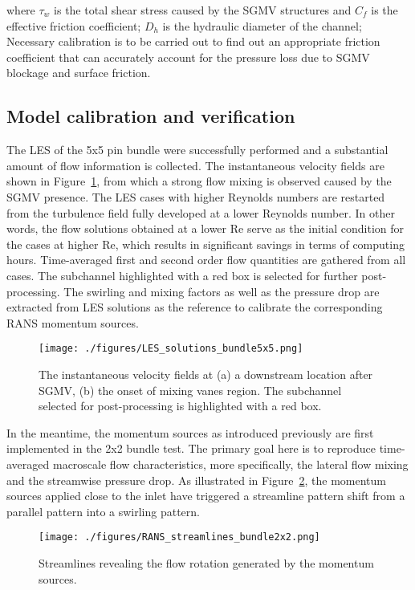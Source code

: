 where $\tau_w$ is the total shear stress caused by the SGMV structures and
$C_f$ is the effective friction coefficient;
$D_h$ is the hydraulic diameter of the channel;
Necessary calibration is to be carried out to find out an appropriate friction coefficient that can accurately account for the pressure loss due to SGMV blockage and surface friction.


\subsection{Model calibration and verification}
\label{sec:msm2}

The LES of the 5x5 pin bundle were successfully performed and a substantial amount of flow information is collected.
The instantaneous velocity fields are shown in Figure~\ref{fig:velles}, from which a strong flow mixing is observed caused by the SGMV presence.
The LES cases with higher Reynolds numbers are restarted from the turbulence field fully developed at a lower Reynolds number.
In other words, the flow solutions obtained at a lower Re serve as the initial condition for the cases at higher Re, which results in significant savings in terms of computing hours.
Time-averaged first and second order flow quantities are gathered from all cases.
The subchannel highlighted with a red box is selected for further post-processing. The swirling and mixing factors as well as the pressure drop are extracted from LES  solutions as the reference to calibrate the corresponding RANS momentum sources.

\begin{figure}[!ht]
\centering
\texttt{[image: ./figures/LES\_solutions\_bundle5x5.png]}
\caption{The instantaneous velocity fields at (a) a downstream location after SGMV, (b) the onset of mixing vanes region. The subchannel selected for post-processing is highlighted with a red box. }
\label{fig:velles}
\end{figure}

In the meantime, the momentum sources as introduced previously are first implemented in the 2x2 bundle test.
The primary goal here is to reproduce time-averaged macroscale flow characteristics, more specifically, the lateral flow mixing and the streamwise pressure drop.
As illustrated in Figure~\ref{fig:streamline}, the momentum sources applied close to the inlet have triggered a streamline pattern shift from a parallel pattern into a swirling pattern.

\begin{figure}[!ht]
\centering
\texttt{[image: ./figures/RANS\_streamlines\_bundle2x2.png]}
\caption{Streamlines revealing the flow rotation generated by the momentum sources. }
\label{fig:streamline}
\end{figure}

